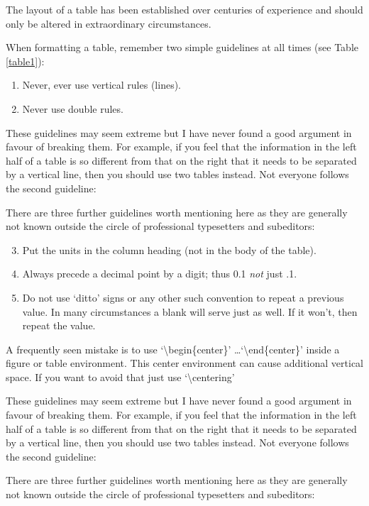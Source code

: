 The layout of a table has been established over centuries of experience and
should only be altered in extraordinary circumstances.

When formatting a table, remember two simple guidelines at all times (see Table \ref{table1}):

\begin{enumerate}
  \item Never, ever use vertical rules (lines).
  \item Never use double rules.
\end{enumerate}

These guidelines may seem extreme but I have
never found a good argument in favour of breaking them. For
example, if you feel that the information in the left half of
a table is so different from that on the right that it needs
to be separated by a vertical line, then you should use two
tables instead. Not everyone follows the second guideline:

There are three further guidelines worth mentioning here as they
are generally not known outside the circle of professional
typesetters and subeditors:

\begin{enumerate}\setcounter{enumi}{2}
  \item Put the units in the column heading (not in the body of
          the table).
  \item Always precede a decimal point by a digit; thus 0.1
      {\em not} just .1.
  \item Do not use `ditto' signs or any other such convention to
      repeat a previous value. In many circumstances a blank
      will serve just as well. If it won't, then repeat the value.
\end{enumerate}

A frequently seen mistake is to use `\textbackslash begin\{center\}' \dots `\textbackslash end\{center\}' inside a figure or table environment. This center environment can cause additional vertical space. If you want to avoid that just use `\textbackslash centering'

These guidelines may seem extreme but I have
never found a good argument in favour of breaking them. For
example, if you feel that the information in the left half of
a table is so different from that on the right that it needs
to be separated by a vertical line, then you should use two
tables instead. Not everyone follows the second guideline:

There are three further guidelines worth mentioning here as they
are generally not known outside the circle of professional
typesetters and subeditors:


